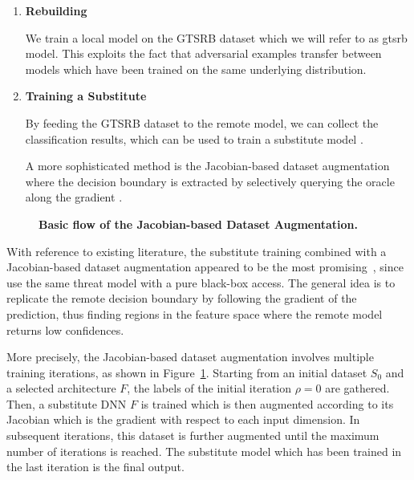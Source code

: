 \begin{enumerate}
\item[1.] \textbf{Rebuilding}

We train a local model on the GTSRB dataset which we will refer to as gtsrb model.
This exploits the fact that adversarial examples transfer between models which have been trained on the same underlying distribution.

\item[2.] \textbf{Training a Substitute}

By feeding the GTSRB dataset to the remote model, we can collect the classification results, which can be used to train a substitute model \cite{tramer2016stealing}.

A more sophisticated method is the Jacobian-based dataset augmentation where the decision boundary is extracted by selectively querying the oracle along the gradient \cite{papernot2017practical}.
\end{enumerate}

\begin{figure}
	
	\caption{\textbf{Basic flow of the Jacobian-based Dataset Augmentation.} \cite{papernot2017practical}}
	\label{fig:jbda}
\end{figure}

With reference to existing literature, the substitute training combined with a Jacobian-based dataset augmentation appeared to be the most promising~\cite{papernot2017practical}, since \citeauthor{papernot2016cleverhans} use the same threat model with a pure black-box access.
The general idea is to replicate the remote decision boundary by following the gradient of the prediction, thus finding regions in the feature space where the remote model returns low confidences.

More precisely, the Jacobian-based dataset augmentation involves multiple training iterations, as shown in Figure~\ref{fig:jbda}.
Starting from an initial dataset $S_0$ and a selected architecture $F$, the labels of the initial iteration $\rho = 0$ are gathered.
Then, a substitute DNN $F$ is trained which is then augmented according to its Jacobian which is the gradient with respect to each input dimension.
In subsequent iterations, this dataset is further augmented until the maximum number of iterations is reached.
The substitute model which has been trained in the last iteration is the final output.

